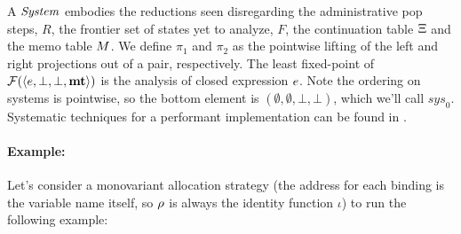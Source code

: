 A $\mathit{System}$ embodies the reductions seen disregarding the administrative pop steps, $R$, the frontier set of states yet to analyze, $F$, the continuation table $\Xi$ and the memo table $M$.
%
We define $\pi_1$ and $\pi_2$ as the pointwise lifting of the left and right projections out of a pair, respectively.
%
%
%
%
The least fixed-point of ${\mathcal F}(\langle e,\bot,\bot,\mathbf{mt} \rangle)$ is the analysis of closed expression $e$.
%
Note the ordering on systems is pointwise, so the bottom element is $(\emptyset,\emptyset,\bot,\bot)$, which we'll call $\mathit{sys}_0$.
%
Systematic techniques for a performant implementation can be found in \citet{ianjohnson:oaam:icfp2013}.
%

\paragraph{Example:} Let's consider a monovariant allocation strategy (the address for each binding is the variable name itself, so $\rho$ is always the identity function $\iota$) to run the following example:

